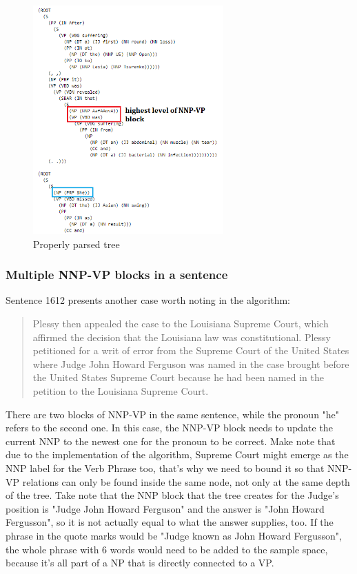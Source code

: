 \documentclass{article}
\begin{document}
\begin{figure}[h!]
    \centering
\includegraphics[width=0.65\textwidth]{Example4.png}
    \caption{Properly parsed tree}
\end{figure}

\subsubsection{Multiple NNP-VP blocks in a sentence}
Sentence 1612 presents another case worth noting in the algorithm:
\begin{quote}
    Plessy then appealed the case to the Louisiana Supreme Court, which affirmed the decision that the Louisiana law was constitutional. Plessy petitioned for a writ of error from the Supreme Court of the United States where Judge John Howard Ferguson was named in the case brought before the United States Supreme Court because he had been named in the petition to the Louisiana Supreme Court.
\end{quote}
There are two blocks of NNP-VP in the same sentence, while the pronoun "he" refers to the second one. In this case, the NNP-VP block needs to update the current NNP to the newest one for the pronoun to be correct. Make note that due to the implementation of the algorithm, Supreme Court might emerge as the NNP label for the Verb Phrase too, that's why we need to bound it so that NNP-VP relations can only be found inside the same node, not only at the same depth of the tree. Take note that the NNP block that the tree creates for the Judge's position is "Judge John Howard Ferguson" and the answer is "John Howard Fergusson", so it is not actually equal to what the answer supplies, too. If the phrase in the quote marks would be "Judge known as John Howard Fergusson", the whole phrase with 6 words would need to be added to the sample space, because it's all part of a NP that is directly connected to a VP.
\end{document}
